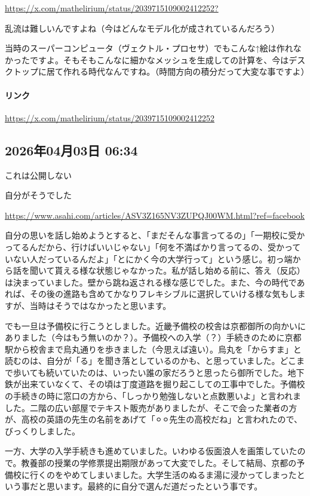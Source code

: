 \url{https://x.com/mathelirium/status/2039715109002412252?}

乱流は難しいんですよね（今はどんなモデル化が成されているんだろう）

当時のスーパーコンピュータ（ヴェクトル・プロセサ）でもこんな↑絵は作れなかったですよ。そもそもこんなに細かなメッシュを生成しての計算を、今はデスクトップに居て作れる時代なんですね。（時間方向の積分だって大変な事ですよ）

\paragraph{リンク}
\url{https://x.com/mathelirium/status/2039715109002412252}

\subsection*{2026年04月03日 06:34}

これは公開しない

自分がそうでした

\url{https://www.asahi.com/articles/ASV3Z165NV3ZUPQJ00WM.html?ref=facebook}

自分の思いを話し始めようとすると、「まだそんな事言ってるの」「一期校に受かってるんだから、行けばいいじゃない」「何を不満ばかり言ってるの、受かっていない人だっているんだよ」「とにかく今の大学行って」という感じ。初っ端から話を聞いて貰える様な状態じゃなかった。私が話し始める前に、答え（反応）は決まっていました。壁から跳ね返される様な感じでした。また、今の時代であれば、その後の進路も含めてかなりフレキシブルに選択していける様な気もしますが、当時はそうではなかったと思います。

でも一旦は予備校に行こうとしました。近畿予備校の校舎は京都御所の向かいにありました（今はもう無いのか？）。予備校への入学（？）手続きのために京都駅から校舎まで烏丸通りを歩きました（今思えば遠い）。烏丸を「からすま」と読むのは、自分が「る」を聞き落としているのかも、と思っていました。どこまで歩いても続いていたのは、いったい誰の家だろうと思ったら御所でした。地下鉄が出来ていなくて、その頃は丁度道路を掘り起こしての工事中でした。予備校の手続きの時に窓口の方から、「しっかり勉強しないと点数悪いよ」と言われました。二階の広い部屋でテキスト販売がありましたが、そこで会った業者の方が、高校の英語の先生の名前をあげて「⚪︎⚪︎先生の高校だね」と言われたので、びっくりしました。

一方、大学の入学手続きも進めていました。いわゆる仮面浪人を画策していたので。教養部の授業の学修票提出期限があって大変でした。そして結局、京都の予備校に行くのをやめてしまいました。大学生活のぬるま湯に浸かってしまったという事だと思います。最終的に自分で選んだ道だったという事です。

